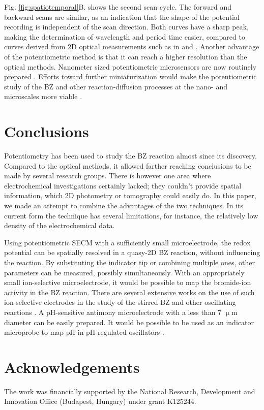 \documentclass[3p, twocolumn]{elsarticle}
\begin{document}
Fig. \ref{fig:spatiotemporal}B. shows the second scan cycle.
The forward and backward scans are similar, as an indication that the shape of the potential recording is independent of the scan direction.
Both curves have a sharp peak, making the determination of wavelength and period time easier, compared to curves derived from 2D optical measurements such as in \cite{muller1985structure} and \cite{nagy1990experimental}.
Another advantage of the potentiometric method is that it can reach a higher resolution than the optical methods.
Nanometer sized potentiometric microsensors are now routinely prepared \cite{elsamadisi2010polished}.
Efforts toward further miniaturization would make the potentiometric study of the BZ and other reaction-diffusion processes at the nano- and microscales more viable \cite{epstein2016reaction}.

\section{Conclusions}
Potentiometry has been used to study the BZ reaction almost since its discovery.
Compared to the optical methods, it allowed farther reaching conclusions to be made by several research groups.
There is however one area where electrochemical investigations certainly lacked; they couldn't provide spatial information, which 2D photometry or tomography could easily do.
In this paper, we made an attempt to combine the advantages of the two techniques.
In its current form the technique has several limitations, for instance, the relatively low density of the electrochemical data.

Using potentiometric SECM with a sufficiently small microelectrode, the redox potential can be spatially resolved in a quasy-2D BZ reaction, without influencing the reaction.
By substituting the indicator tip or combining multiple ones, other parameters can be measured, possibly simultaneously.
With an appropriately small ion-selective microelectrode, it would be possible to map the bromide-ion activity in the BZ reaction.
There are several extensive works on the use of such ion-selective electrodes in the study of the stirred BZ and other oscillating reactions \cite{noszticzius1982use, noszticzius1983use}.
A pH-sensitive antimony microelectrode with a less than 7 $\upmu$m diameter can be easily prepared.
It would be possible to be used as an indicator microprobe to map pH in pH-regulated oscillators \cite{orban2015ph}.

\section*{Acknowledgements}
The work was financially supported by the National Research, Development and Innovation Office (Budapest, Hungary) under grant K125244.

{}

\end{document}
